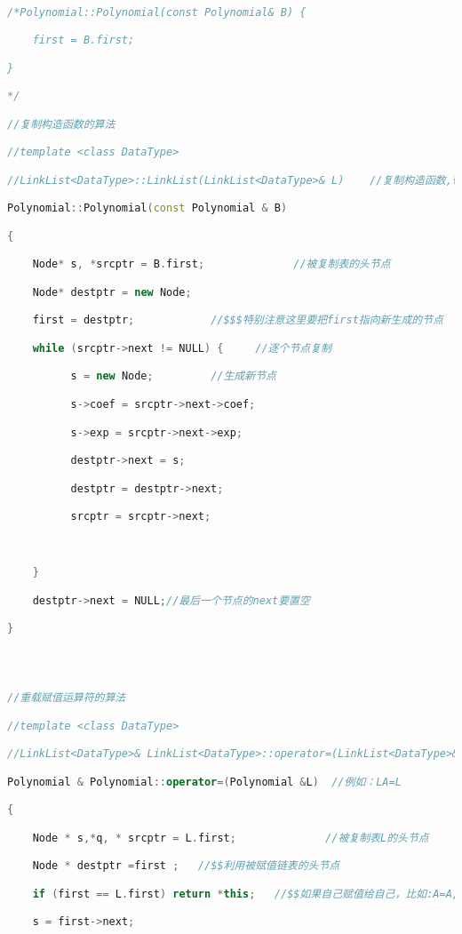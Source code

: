 \begin{lstlisting}[language=C++]
  

/*Polynomial::Polynomial(const Polynomial& B) {

    first = B.first;

}

*/

//复制构造函数的算法

//template <class DataType>

//LinkList<DataType>::LinkList(LinkList<DataType>& L)    //复制构造函数,带头节点

Polynomial::Polynomial(const Polynomial & B)

{

    Node* s, *srcptr = B.first;              //被复制表的头节点

    Node* destptr = new Node;

    first = destptr;            //$$$特别注意这里要把first指向新生成的节点

    while (srcptr->next != NULL) {     //逐个节点复制

          s = new Node;         //生成新节点

          s->coef = srcptr->next->coef;

          s->exp = srcptr->next->exp;

          destptr->next = s;

          destptr = destptr->next;

          srcptr = srcptr->next;

  

    }

    destptr->next = NULL;//最后一个节点的next要置空  

}

  
  

//重载赋值运算符的算法

//template <class DataType>

//LinkList<DataType>& LinkList<DataType>::operator=(LinkList<DataType>& L)    //重载赋值函数，实现A=B赋值

Polynomial & Polynomial::operator=(Polynomial &L)  //例如：LA=L

{

    Node * s,*q, * srcptr = L.first;              //被复制表L的头节点

    Node * destptr =first ;   //$$利用被赋值链表的头节点

    if (first == L.first) return *this;   //$$如果自己赋值给自己，比如:A=A,直接返回

    s = first->next;


\end{lstlisting}
